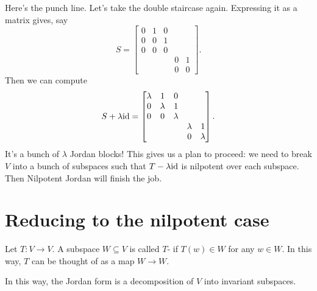 Here's the punch line.
Let's take the double staircase again.
Expressing it as a matrix gives, say
\[
	S = \begin{bmatrix}
		0 & 1 & 0 &   &   \\
		0 & 0 & 1 &   &   \\
		0 & 0 & 0 &   &   \\
		  &   &   & 0 & 1 \\
		  &   &   & 0 & 0
	\end{bmatrix}.
\]
Then we can compute
\[
	S + \lambda \mathrm{id} = \begin{bmatrix}
		\lambda & 1 & 0 &   &   \\
		0 & \lambda & 1 &   &   \\
		0 & 0 & \lambda &   &   \\
		  &   &   & \lambda & 1 \\
		  &   &   & 0 & \lambda
	\end{bmatrix}.
\]
It's a bunch of $\lambda$ Jordan blocks!
This gives us a plan to proceed: we need to break $V$ into
a bunch of subspaces such that $T - \lambda \mathrm{id}$ is nilpotent over each subspace.
Then Nilpotent Jordan will finish the job.

\section{Reducing to the nilpotent case}
\begin{definition}
	Let $T \colon V \to V$. A subspace $W \subseteq V$
	is called $T$-
	if $T(w) \in W$ for any $w \in W$.
	In this way, $T$ can be thought of as a map $W \to W$.
\end{definition}
In this way, the Jordan form is a decomposition of $V$ into invariant subspaces.

